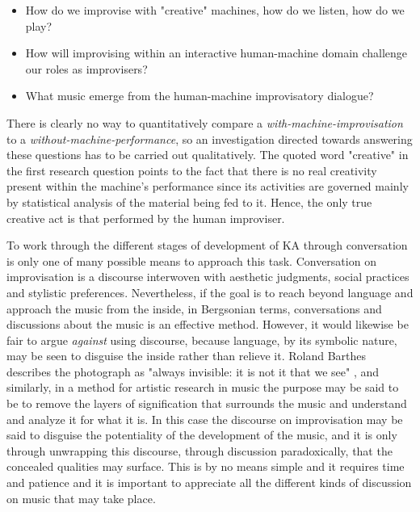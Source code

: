 \documentclass[11pt]{article}
\begin{document}
\begin{itemize}
\item How do we improvise with "creative" machines, how do we listen, how do we play?
\item How will improvising within an interactive human-machine domain challenge our roles as improvisers?
\item What music emerge from the human-machine improvisatory dialogue?
\end{itemize}

There is clearly no way to quantitatively compare a \emph{with-machine-improvisation} to a \emph{without-machine-performance}, so an investigation directed towards answering these questions has to be carried out qualitatively. The quoted word "creative" in the first research question points to the fact that there is no real creativity present within the machine's performance since its activities are governed mainly by statistical analysis of the material being fed to it. Hence, the only true creative act is that performed by the human improviser.

To work through the different stages of development of KA through conversation is only one of many possible means to approach this task. Conversation on improvisation is a discourse interwoven with aesthetic judgments, social practices and stylistic preferences. Nevertheless, if the goal is to reach beyond language and approach the music from the inside, in Bergsonian terms, conversations and discussions about the music is an effective method. However, it would likewise be fair to argue \emph{against} using discourse, because language, by its symbolic nature, may be seen to disguise the inside rather than relieve it. Roland Barthes describes the photograph as "always invisible: it is not it that we see" \citep[p. 6]{Barthes1980}, and similarly, in a method for artistic research in music the purpose may be said to be to remove the layers of signification that surrounds the music and understand and analyze it for what it is. In this case the discourse on improvisation may be said to disguise the potentiality of the development of the music, and it is only through unwrapping this discourse, through discussion paradoxically, that the concealed qualities may surface. This is by no means simple and it requires time and patience and it is important to appreciate all the different kinds of discussion on music that may take place.
\end{document}
